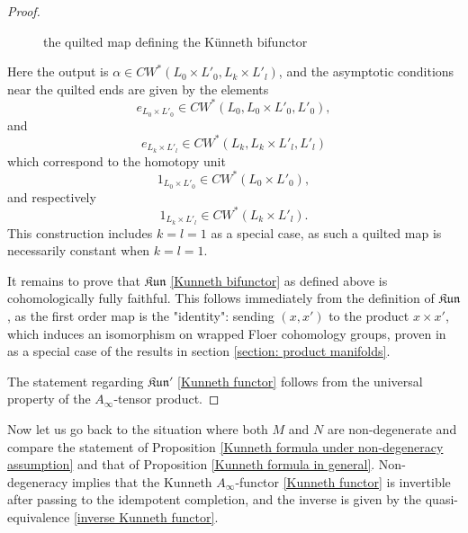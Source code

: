 \documentclass{amsart}
\numberwithin{equation}{section}
\numberwithin{figure}{section}
\begin{document}
\begin{proof}
\begin{figure}
\centering
\caption{the quilted map defining the K\"{u}nneth bifunctor}
\end{figure}

Here the output is $\alpha \in CW^{*}(L_{0} \times L'_{0}, L_{k} \times L'_{l})$, and the asymptotic conditions near the quilted ends are given by the elements
\begin{equation*}
e_{L_{0} \times L'_{0}} \in CW^{*}(L_{0}, L_{0} \times L'_{0}, L'_{0}),
\end{equation*}
and
\begin{equation*}
e_{L_{k} \times L'_{l}} \in CW^{*}(L_{k}, L_{k} \times L'_{l}, L'_{l})
\end{equation*}
which correspond to the homotopy unit
\begin{equation*}
1_{L_{0} \times L'_{0}} \in CW^{*}(L_{0} \times L'_{0}),
\end{equation*}
and respectively
\begin{equation*}
1_{L_{k} \times L'_{l}} \in CW^{*}(L_{k} \times L'_{l}).
\end{equation*}
This construction includes $k = l = 1$ as a special case, as such a quilted map is necessarily constant when $k = l = 1$. \par
	It remains to prove that $\mathfrak{Kun}$ \eqref{Kunneth bifunctor} as defined above is cohomologically fully faithful. This follows immediately from the definition of $\mathfrak{Kun}$, as the first order map is the "identity": sending $(x, x')$ to the product $x \times x'$, which induces an isomorphism on wrapped Floer cohomology groups, proven in \cite{Gao1} as a special case of the results in section \ref{section: product manifolds}. \par
	The statement regarding $\mathfrak{Kun}'$ \eqref{Kunneth functor} follows from the universal property of the $A_{\infty}$-tensor product. \par
\end{proof}

	Now let us go back to the situation where both $M$ and $N$ are non-degenerate and compare the statement of Proposition \ref{Kunneth formula under non-degeneracy assumption} and that of Proposition \ref{Kunneth formula in general}. Non-degeneracy implies that the Kunneth $A_{\infty}$-functor \eqref{Kunneth functor} is invertible after passing to the idempotent completion, and the inverse is given by the quasi-equivalence \eqref{inverse Kunneth functor}. \par
\end{document}
